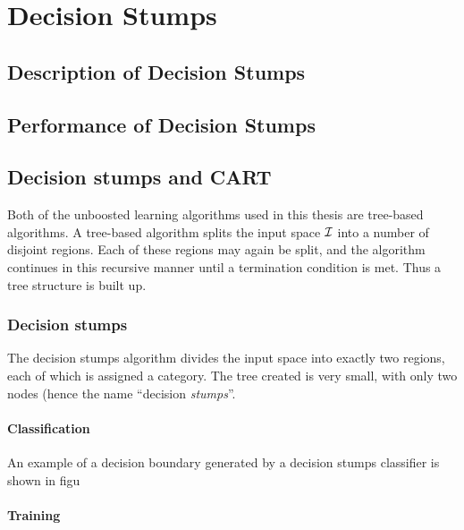 


\chapter{Decision Stumps}

\section{Description of Decision Stumps}

\section{Performance of Decision Stumps}



\section{Decision stumps and CART}

Both of the unboosted learning algorithms used in this thesis are
tree-based algorithms.  A tree-based algorithm splits the input space
$\mathcal{I}$ into a number of disjoint regions.  Each of these regions may
again be split, and the algorithm continues in this recursive manner
until a termination condition is met.  Thus a tree structure is built
up.

\subsection{Decision stumps}

The decision stumps algorithm divides the input space into exactly two
regions, each of which is assigned a category.  The tree created is
very small, with only two nodes (hence the name ``decision
\emph{stumps}''.

\subsubsection{Classification}

An example of a decision boundary generated by a decision stumps
classifier is shown in figu


\subsubsection{Training}



